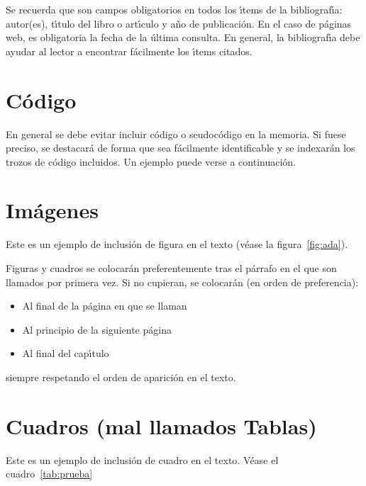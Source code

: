 Se recuerda que son campos obligatorios
en todos los {\'\i}tems de la bibliograf{\'\i}a: 
autor(es), t{\'\i}tulo del libro o art{\'\i}culo 
y a{\~n}o de publicaci\'on.
En el caso de p\'aginas web, 
es obligatoria la fecha de la \'ultima consulta. 
En general, la bibliograf{\'\i}a debe ayudar al lector a encontrar f\'acilmente los {\'\i}tems citados.

\section{C\'odigo}

En general se debe evitar incluir c\'odigo o seudoc\'odigo en la memoria. Si fuese preciso, se destacar\'a de forma
que sea f\'acilmente identificable y se indexar\'an los trozos de c\'odigo incluidos. Un ejemplo puede verse
a continuaci\'on.


\section{Im\'agenes}

Este es un ejemplo de inclusi\'on de figura en el texto (v\'ease la figura~\ref{fig:ada}). 


Figuras y cuadros se colocar\'an preferentemente tras el p\'arrafo en el que
son llamados por primera vez. Si no cupieran, se colocar\'an (en orden de preferencia):
\begin{itemize}
 \item Al final de la p\'agina en que se llaman
 \item Al principio de la siguiente p\'agina
 \item Al final del cap{\'\i}tulo
\end{itemize}
siempre respetando el orden de aparici\'on en el texto.

\section{Cuadros (mal llamados Tablas)}

Este es un ejemplo de inclusi\'on de cuadro en el texto. V\'ease el cuadro~\ref{tab:prueba}

